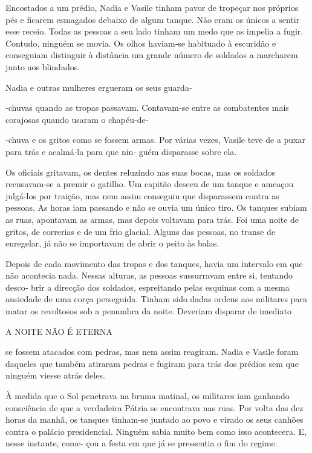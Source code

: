 Encostados a um prédio, Nadia e Vasile tinham pavor de tropeçar nos
próprios pés e ficarem esmagados debaixo de algum tanque. Não eram os
únicos a sentir esse receio. Todas as pessoas a seu lado tinham um medo
que as impelia a fugir. Contudo, ninguém se movia. Os olhos haviam‑se
habituado à escuridão e conseguiam distinguir à distância um grande
número de soldados a marcharem junto aos blindados.

Nadia e outras mulheres ergueram os seus guarda‑

‑chuvas quando as tropas passavam. Contavam‑se entre as combatentes mais
corajosas quando usaram o chapéu‑de‑

‑chuva e os gritos como se fossem armas. Por várias vezes, Vasile teve
de a puxar para trás e acalmá‑la para que nin‑ guém disparasse sobre
ela.

Os oficiais gritavam, os dentes reluzindo nas suas bocas, mas os
soldados recusavam‑se a premir o gatilho. Um capitão desceu de um tanque
e ameaçou julgá‑los por traição, mas nem assim conseguiu que disparassem
contra as pessoas. As horas iam passando e não se ouvia um único tiro.
Os tanques subiam as ruas, apontavam as armas, mas depois voltavam para
trás. Foi uma noite de gritos, de correrias e de um frio glacial. Alguns
das pessoas, no transe de enregelar, já não se importavam de abrir o
peito às balas.

Depois de cada movimento das tropas e dos tanques, havia um intervalo em
que não acontecia nada. Nessas alturas, as pessoas sussurravam entre si,
tentando desco‑ brir a direcção dos soldados, espreitando pelas esquinas
com a mesma ansiedade de uma corça perseguida. Tinham sido dadas ordens
aos militares para matar os revoltosos sob a penumbra da noite. Deveriam
disparar de imediato

A NOITE NÃO É ETERNA

se fossem atacados com pedras, mas nem assim reagiram. Nadia e Vasile
foram daqueles que também atiraram pedras e fugiram para trás dos
prédios sem que ninguém viesse atrás deles.

À medida que o Sol penetrava na bruma matinal, os militares iam ganhando
consciência de que a verdadeira Pátria se encontrava nas ruas. Por volta
das dez horas da manhã, os tanques tinham‑se juntado ao povo e virado os
seus canhões contra o palácio presidencial. Ninguém sabia muito bem como
isso acontecera. E, nesse instante, come‑ çou a festa em que já se
pressentia o fim do regime.

